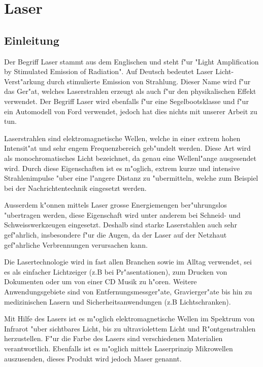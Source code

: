 \chapter{Laser\label{chapter:laser}}
\begin{refsection}


\section{Einleitung}
Der Begriff Laser stammt aus dem Englischen und steht f"ur 
"{}Light Amplification by Stimulated Emission of Radiation"{}.
Auf Deutsch bedeutet Laser Licht-Verst"arkung durch stimulierte Emission 
von Strahlung. Dieser Name wird f"ur das Ger"at, welches Laserstrahlen erzeugt 
als auch f"ur den physikalischen Effekt verwendet. Der Begriff Laser wird
ebenfalls f"ur eine Segelbootsklasse und f"ur ein Automodell von Ford
verwendet,
jedoch hat dies nichts mit unserer Arbeit zu tun.

Laserstrahlen sind elektromagnetische Wellen,
welche in einer extrem hohen Intensit"at und sehr engem
Frequenzbereich geb"undelt werden. Diese Art wird als monochromatisches
Licht bezeichnet, da genau eine Wellenl"ange ausgesendet wird. 
Durch diese Eigenschaften ist es m"oglich, extrem kurze und
intensive Strahlenimpulse "uber eine l"angere Distanz zu "ubermitteln,
welche zum Beispiel bei der Nachrichtentechnik eingesetzt werden.

Ausserdem k"onnen mittels Laser grosse Energiemengen ber"uhrungslos
"ubertragen werden, diese Eigenschaft wird unter anderem bei Schneid-
und Schweisswerkzeugen eingesetzt. Deshalb sind starke Laserstahlen auch 
sehr gef"ahrlich, insbesondere f"ur die Augen, da der Laser auf der Netzhaut
gef"ahrliche Verbrennungen verursachen kann.

Die Lasertechnologie wird in fast allen Branchen sowie im Alltag verwendet, 
sei es als einfacher Lichtzeiger (z.B bei Pr"asentationen),
zum Drucken von Dokumenten oder um von einer CD Musik zu h"oren. 
Weitere Anwendungsgebiete sind von Entfernungsmessger"ate, 
Gravierger"ate bis hin zu medizinischen Lasern und Sicherheitsanwendungen
(z.B Lichtschranken).

Mit Hilfe des Lasers ist es m"oglich elektromagnetische Wellen im Spektrum
von Infrarot "uber sichtbares Licht, bis zu ultraviolettem Licht und 
R"ontgenstrahlen herzustellen. F"ur die Farbe des Lasers sind 
verschiedenen Materialien verantwortlich. Ebenfalls ist es m"oglich mittels 
Laserprinzip Mikrowellen auszusenden, dieses Produkt wird jedoch Maser genannt.



\end{refsection}
